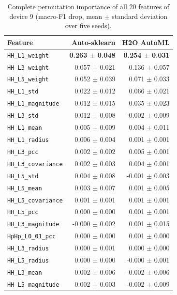 \begin{table}[t]
\centering
\caption{Complete permutation importance of all 20 features of device 9 (macro-F1 drop, mean $\pm$ standard deviation over five seeds).}
\label{tab:pfifull}
\scriptsize
\setlength{\tabcolsep}{3pt}
\begin{tabular}{@{}lrr@{}}
\toprule
Feature & Auto-sklearn & H2O AutoML \\
\midrule
\texttt{HH\_L1\_weight} & \textbf{0.263 $\pm$ 0.048} & \textbf{0.254 $\pm$ 0.031} \\
\texttt{HH\_L3\_weight} & 0.057 $\pm$ 0.021 & 0.136 $\pm$ 0.057 \\
\texttt{HH\_L5\_weight} & 0.052 $\pm$ 0.039 & 0.071 $\pm$ 0.033 \\
\texttt{HH\_L1\_std} & 0.022 $\pm$ 0.012 & 0.066 $\pm$ 0.021 \\
\texttt{HH\_L1\_magnitude} & 0.012 $\pm$ 0.015 & 0.035 $\pm$ 0.023 \\
\texttt{HH\_L3\_std} & 0.012 $\pm$ 0.008 & -0.002 $\pm$ 0.009 \\
\texttt{HH\_L1\_mean} & 0.005 $\pm$ 0.009 & 0.004 $\pm$ 0.011 \\
\texttt{HH\_L1\_radius} & 0.006 $\pm$ 0.004 & 0.001 $\pm$ 0.001 \\
\texttt{HH\_L3\_pcc} & 0.002 $\pm$ 0.002 & 0.005 $\pm$ 0.001 \\
\texttt{HH\_L3\_covariance} & 0.002 $\pm$ 0.003 & 0.004 $\pm$ 0.001 \\
\texttt{HH\_L5\_std} & 0.004 $\pm$ 0.008 & -0.001 $\pm$ 0.003 \\
\texttt{HH\_L5\_mean} & 0.003 $\pm$ 0.007 & 0.001 $\pm$ 0.005 \\
\texttt{HH\_L5\_covariance} & 0.001 $\pm$ 0.001 & 0.001 $\pm$ 0.001 \\
\texttt{HH\_L5\_pcc} & 0.000 $\pm$ 0.000 & 0.001 $\pm$ 0.001 \\
\texttt{HH\_L3\_magnitude} & -0.000 $\pm$ 0.002 & 0.001 $\pm$ 0.015 \\
\texttt{HpHp\_L0\_01\_pcc} & 0.000 $\pm$ 0.000 & 0.001 $\pm$ 0.000 \\
\texttt{HH\_L3\_radius} & 0.000 $\pm$ 0.001 & 0.000 $\pm$ 0.000 \\
\texttt{HH\_L5\_radius} & 0.000 $\pm$ 0.000 & -0.000 $\pm$ 0.001 \\
\texttt{HH\_L3\_mean} & 0.002 $\pm$ 0.006 & -0.002 $\pm$ 0.006 \\
\texttt{HH\_L5\_magnitude} & 0.002 $\pm$ 0.003 & -0.002 $\pm$ 0.009 \\
\bottomrule
\end{tabular}
\end{table}
